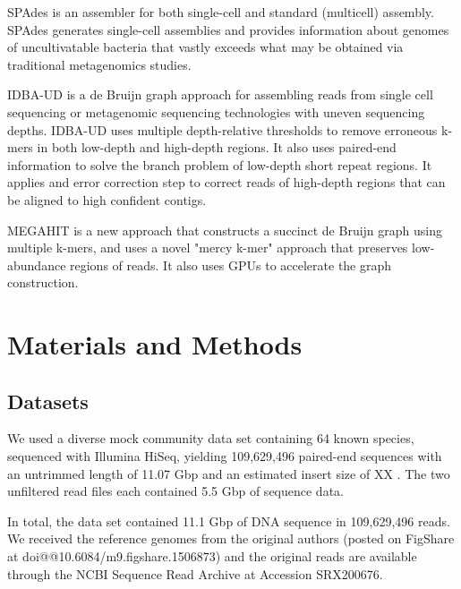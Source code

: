 SPAdes \cite{spades} is an assembler for both single-cell and standard (multicell) assembly. SPAdes generates single-cell assemblies and provides information about genomes of uncultivatable bacteria that vastly exceeds what may be obtained via traditional metagenomics studies. 

IDBA-UD \cite{idba} is a de Bruijn graph approach for assembling reads from single cell sequencing or metagenomic sequencing technologies with uneven sequencing depths. IDBA-UD uses multiple depth-relative thresholds to remove erroneous k-mers in both low-depth and high-depth regions. It also uses paired-end information  to solve the branch problem of low-depth short repeat regions. It applies and error correction step to correct reads of high-depth regions that can be aligned to high confident contigs.

MEGAHIT \cite{megahit} is a new approach that constructs a succinct de Bruijn graph using multiple k-mers, and uses a novel "mercy k-mer" approach that preserves low-abundance regions of reads. It also uses GPUs to accelerate the graph construction.
 

\section*{Materials and Methods}

\subsection*{Datasets}

We used a diverse mock community data set containing 64 known species,
sequenced with Illumina HiSeq, yielding 109,629,496 paired-end sequences with
an untrimmed length of 11.07 Gbp and an estimated insert size of XX
\cite{podar}.  The two unfiltered read files each contained 5.5 Gbp of
sequence data. %


In total, the data set contained 11.1 Gbp of DNA sequence in 109,629,496
reads.  We received the reference genomes from the original authors
(posted on FigShare at doi@@10.6084/m9.figshare.1506873) and the original reads are available through
the NCBI Sequence Read Archive at Accession SRX200676.

